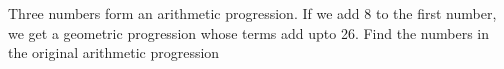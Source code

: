 
%
%
%
%
% 
% 

\question Three numbers form an arithmetic progression. If we add 8 to the first number,
 we get a geometric progression whose terms add upto 26. Find the numbers in the original 
 arithmetic progression

\insertQR{}

\ifprintanswers
\fi 

